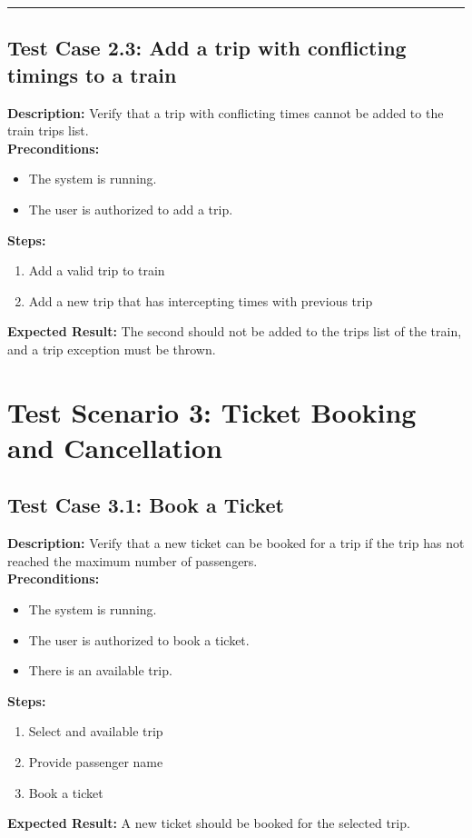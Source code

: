 \documentclass{article}
\begin{document}
\bigskip
\hrule
\bigskip

\subsection{Test Case 2.3: Add a trip with conflicting timings to a train}

\textbf{Description:} Verify that a trip with conflicting times cannot be added to the train trips list.\\
\textbf{Preconditions:}
\begin{itemize}
  \item The system is running.
  \item The user is authorized to add a trip.
\end{itemize}
\textbf{Steps:}
\begin{enumerate}
  \item Add a valid trip to train
  \item Add a new trip that has intercepting times with previous trip
\end{enumerate}
\textbf{Expected Result:} The second should not be added to the trips list of the train, and a trip exception must be thrown.

\pagebreak

\section{Test Scenario 3: Ticket Booking and Cancellation}
\bigskip
\bigskip
\subsection{Test Case 3.1: Book a Ticket}

\textbf{Description:} Verify that a new ticket can be booked for a trip if the trip has not reached the maximum number of passengers.\\
\textbf{Preconditions:}
\begin{itemize}
  \item The system is running.
  \item The user is authorized to book a ticket.
  \item There is an available trip.
\end{itemize}
\textbf{Steps:}
\begin{enumerate}
  \item Select and available trip
  \item Provide passenger name
  \item Book a ticket
\end{enumerate}
\textbf{Expected Result:}  A new ticket should be booked for the selected trip.
\end{document}
